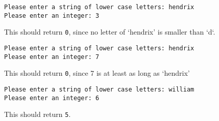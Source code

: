 \documentclass{article}
\begin{document}
\begin{enumerate}
\begin{verbatim}
Please enter a string of lower case letters: hendrix
Please enter an integer: 3
\end{verbatim}
This should return \verb|0|, since no letter of `hendrix' is smaller than `d`.

\begin{verbatim}
Please enter a string of lower case letters: hendrix
Please enter an integer: 7
\end{verbatim}
This should return \verb|0|, since 7 is at least as long as `hendrix'

\begin{verbatim}
Please enter a string of lower case letters: william
Please enter an integer: 6
\end{verbatim}
This should return \verb|5|.

\end{enumerate}
\end{document}
